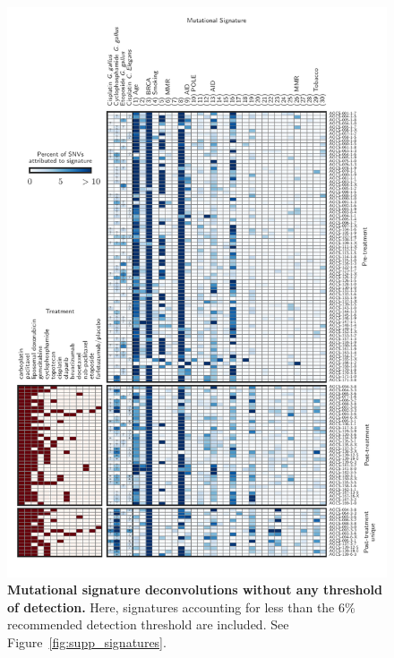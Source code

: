 \begin{figure}
\centering
\includegraphics[scale=1.0]{figures/supplementary_signatures_no_cutoff.pdf}
\caption{\textbf{Mutational signature deconvolutions without any threshold of detection.} Here, signatures accounting for less than the 6\% recommended detection threshold are included. See Figure~\ref{fig:supp_signatures}.}
\label{fig:supplementary_signatures_no_cutoff.pdf}
\end{figure}


